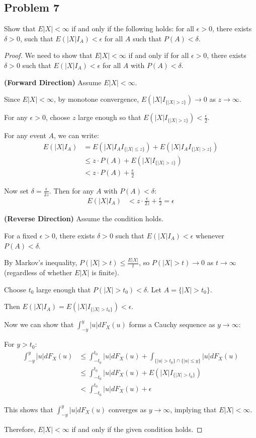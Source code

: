 \documentclass[letterpaper, 11pt]{article}
\newcommand{\1}{\mathds{1}}	%
\theoremstyle{definition}
\begin{document}
\subsection*{Problem 7}
Show that $E|X| < \infty$ if and only if the following holds: for all $\epsilon > 0$, there exists $\delta > 0$, such that $E(|X|I_A) < \epsilon$ for all $A$ such that $P(A) < \delta$.
\begin{proof}
    We need to show that $E|X| < \infty$ if and only if for all $\epsilon > 0$, there exists $\delta > 0$ such that $E(|X|I_A) < \epsilon$ for all $A$ with $P(A) < \delta$.

\textbf{(Forward Direction)} Assume $E|X| < \infty$.

Since $E|X| < \infty$, by monotone convergence, $E(|X|I_{\{|X|>z\}}) \rightarrow 0$ as $z \rightarrow \infty$.

For any $\epsilon > 0$, choose $z$ large enough so that $E(|X|I_{\{|X|>z\}}) < \frac{\epsilon}{2}$.

For any event $A$, we can write:
\begin{align*}
E(|X|I_A) &= E(|X|I_A I_{\{|X| \leq z\}}) + E(|X|I_A I_{\{|X| > z\}})\\
&\leq z \cdot P(A) + E(|X|I_{\{|X| > z\}})\\
&< z \cdot P(A) + \frac{\epsilon}{2}
\end{align*}

Now set $\delta = \frac{\epsilon}{2z}$. Then for any $A$ with $P(A) < \delta$:
\begin{align*}
E(|X|I_A) &< z \cdot \frac{\epsilon}{2z} + \frac{\epsilon}{2} = \epsilon
\end{align*}

\textbf{(Reverse Direction)} Assume the condition holds.

For a fixed $\epsilon > 0$, there exists $\delta > 0$ such that $E(|X|I_A) < \epsilon$ whenever $P(A) < \delta$.

By Markov's inequality, $P(|X| > t) \leq \frac{E|X|}{t}$, so $P(|X| > t) \rightarrow 0$ as $t \rightarrow \infty$ (regardless of whether $E|X|$ is finite).

Choose $t_0$ large enough that $P(|X| > t_0) < \delta$. Let $A = \{|X| > t_0\}$.

Then $E(|X|I_A) = E(|X|I_{\{|X| > t_0\}}) < \epsilon$.

Now we can show that $\int_{-y}^y |u| dF_X(u)$ forms a Cauchy sequence as $y \rightarrow \infty$:

For $y > t_0$:
\begin{align*}
\int_{-y}^y |u| dF_X(u) &\leq \int_{-t_0}^{t_0} |u| dF_X(u) + \int_{\{|u|>t_0\} \cap \{|u|\leq y\}} |u| dF_X(u)\\
&\leq \int_{-t_0}^{t_0} |u| dF_X(u) + E(|X|I_{\{|X| > t_0\}})\\
&< \int_{-t_0}^{t_0} |u| dF_X(u) + \epsilon
\end{align*}

This shows that $\int_{-y}^y |u| dF_X(u)$ converges as $y \rightarrow \infty$, implying that $E|X| < \infty$.

Therefore, $E|X| < \infty$ if and only if the given condition holds.
\end{proof}
\end{document}
